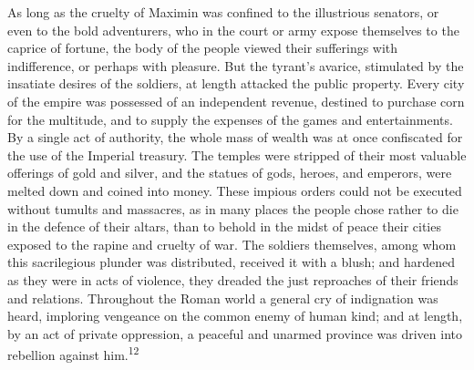 As long as the cruelty of Maximin was confined to the illustrious
senators, or even to the bold adventurers, who in the court or
army expose themselves to the caprice of fortune, the body of the
people viewed their sufferings with indifference, or perhaps with
pleasure. But the tyrant’s avarice, stimulated by the insatiate
desires of the soldiers, at length attacked the public property.
Every city of the empire was possessed of an independent revenue,
destined to purchase corn for the multitude, and to supply the
expenses of the games and entertainments. By a single act of
authority, the whole mass of wealth was at once confiscated for
the use of the Imperial treasury. The temples were stripped of
their most valuable offerings of gold and silver, and the statues
of gods, heroes, and emperors, were melted down and coined into
money. These impious orders could not be executed without tumults
and massacres, as in many places the people chose rather to die
in the defence of their altars, than to behold in the midst of
peace their cities exposed to the rapine and cruelty of war. The
soldiers themselves, among whom this sacrilegious plunder was
distributed, received it with a blush; and hardened as they were
in acts of violence, they dreaded the just reproaches of their
friends and relations. Throughout the Roman world a general cry
of indignation was heard, imploring vengeance on the common enemy
of human kind; and at length, by an act of private oppression, a
peaceful and unarmed province was driven into rebellion against
him.\textsuperscript{12}


